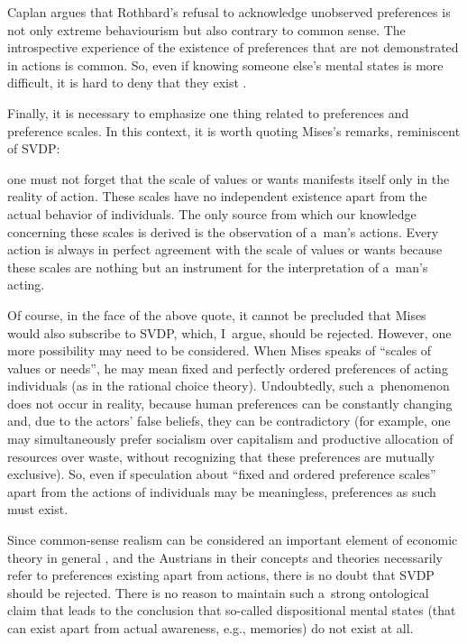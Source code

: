 Caplan argues that Rothbard's refusal to acknowledge unobserved preferences is not only extreme behaviourism but also contrary to common sense. The introspective experience of the existence of preferences that are not demonstrated in actions is common. So, even if knowing someone else's mental states is more difficult, it is hard to deny that they exist 
\parencite[][p.834]{caplan_austrian_1999}.%




Finally, it is necessary to emphasize one thing related to preferences and preference scales. In this context, it is worth quoting Mises's remarks, reminiscent of SVDP:



one must not forget that the scale of values or wants manifests itself only in the reality of action. These scales have no independent existence apart from the actual behavior of individuals. The only source from which our knowledge concerning these scales is derived is the observation of a~man's actions. Every action is always in perfect agreement with the scale of values or wants because these scales are nothing but an instrument for the interpretation of a~man's acting. 
\parencite[][p.95]{mises_human_1998}%




Of course, in the face of the above quote, it cannot be precluded that Mises would also subscribe to SVDP, which, I~argue, should be rejected. However, one more possibility may need to be considered. When Mises speaks of ``scales of values or needs'', he may mean fixed and perfectly ordered preferences of acting individuals (as in the rational choice theory). Undoubtedly, such a~phenomenon does not occur in reality, because human preferences can be constantly changing and, due to the actors' false beliefs, they can be contradictory (for example, one may simultaneously prefer socialism over capitalism and productive allocation of resources over waste, without recognizing that these preferences are mutually exclusive). So, even if speculation about ``fixed and ordered preference scales'' apart from the actions of individuals may be meaningless, preferences as such must exist.



Since common-sense realism can be considered an important element of economic theory in general 
\parencite[][]{hausman_realism_2008}, %
 and the Austrians in their concepts and theories necessarily refer to preferences existing apart from actions, there is no doubt that SVDP should be rejected. There is no reason to maintain such a~strong ontological claim that leads to the conclusion that so-called dispositional mental states (that can exist apart from actual awareness, e.g., memories) do not exist at all.



